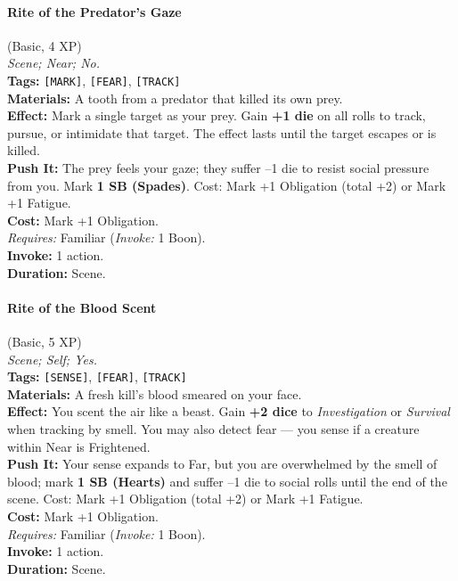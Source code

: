 \paragraph{Rite of the Predator's Gaze} (Basic, 4 XP) \hfill \\
\emph{Scene; Near; No.} \\
\textbf{Tags:} \texttt{[MARK]}, \texttt{[FEAR]}, \texttt{[TRACK]} \\
\textbf{Materials:} A tooth from a predator that killed its own prey. \\
\textbf{Effect:} Mark a single target as your prey. Gain \textbf{+1 die} on all rolls to track, pursue, or intimidate that target. The effect lasts until the target escapes or is killed. \\
\textbf{Push It:} The prey feels your gaze; they suffer --1 die to resist social pressure from you. Mark \textbf{1 SB (Spades)}. Cost: Mark +1 Obligation (total +2) or Mark +1 Fatigue. \\
\textbf{Cost:} Mark +1 Obligation. \\
\textit{Requires:} Familiar (\textit{Invoke:} 1 Boon). \\
\textbf{Invoke:} 1 action. \\
\textbf{Duration:} Scene.

\paragraph{Rite of the Blood Scent} (Basic, 5 XP) \hfill \\
\emph{Scene; Self; Yes.} \\
\textbf{Tags:} \texttt{[SENSE]}, \texttt{[FEAR]}, \texttt{[TRACK]} \\
\textbf{Materials:} A fresh kill's blood smeared on your face. \\
\textbf{Effect:} You scent the air like a beast. Gain \textbf{+2 dice} to \textit{Investigation} or \textit{Survival} when tracking by smell. You may also detect fear --- you sense if a creature within Near is Frightened. \\
\textbf{Push It:} Your sense expands to Far, but you are overwhelmed by the smell of blood; mark \textbf{1 SB (Hearts)} and suffer --1 die to social rolls until the end of the scene. Cost: Mark +1 Obligation (total +2) or Mark +1 Fatigue. \\
\textbf{Cost:} Mark +1 Obligation. \\
\textit{Requires:} Familiar (\textit{Invoke:} 1 Boon). \\
\textbf{Invoke:} 1 action. \\
\textbf{Duration:} Scene.

